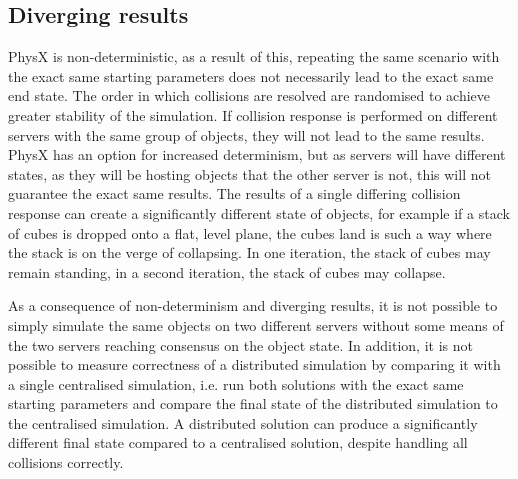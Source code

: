 \subsection{Diverging results}\label{divergingResults}
PhysX is non-deterministic, as a result of this, repeating the same scenario with the exact same starting parameters does not necessarily lead to the exact same end state. The order in which collisions are resolved are randomised to achieve greater stability of the simulation.
If collision response is performed on different servers with the same group of objects, they will not lead to the same results. PhysX has an option for increased determinism, but as servers will have different states, as they will be hosting objects that the other server is not, this will not guarantee the exact same results. The results of a single differing collision response can create a significantly different state of objects, for example if a stack of cubes is dropped onto a flat, level plane, the cubes land is such a way where the stack is on the verge of collapsing. In one iteration, the stack of cubes may remain standing, in a second iteration, the stack of cubes may collapse.

As a consequence of non-determinism and diverging results, it is not possible to simply simulate the same objects on two different servers without some means of the two servers reaching consensus on the object state. In addition, it is not possible to measure correctness of a distributed simulation by comparing it with a single centralised simulation, i.e. run both solutions with the exact same starting parameters and compare the final state of the distributed simulation to the centralised simulation. A distributed solution can produce a significantly different final state compared to a centralised solution, despite handling all collisions correctly.

